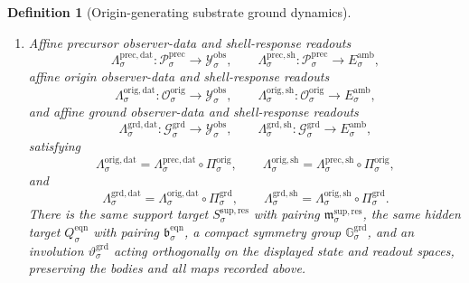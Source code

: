 \documentclass[11pt]{article}
\newcommand{\DataSpace}[1]{\mathcal Y_{#1}^{\mathrm{obs}}}
\newcommand{\AmbientTarget}[1]{E_{#1}^{\mathrm{amb}}}
\newcommand{\ResTarget}[1]{S_{#1}^{\mathrm{sup,res}}}
\newcommand{\ResPair}[1]{\mathfrak m_{#1}^{\mathrm{sup,res}}}
\newcommand{\PrecSpace}[1]{\mathcal P_{#1}^{\mathrm{prec}}}
\newcommand{\PrecData}[1]{\Lambda_{#1}^{\mathrm{prec,dat}}}
\newcommand{\PrecShellMap}[1]{\Lambda_{#1}^{\mathrm{prec,sh}}}
\newcommand{\OrigSpace}[1]{\mathcal O_{#1}^{\mathrm{orig}}}
\newcommand{\OrigProj}[1]{\Pi_{#1}^{\mathrm{orig}}}
\newcommand{\OrigData}[1]{\Lambda_{#1}^{\mathrm{orig,dat}}}
\newcommand{\OrigShellMap}[1]{\Lambda_{#1}^{\mathrm{orig,sh}}}
\newcommand{\GroundSpace}[1]{\mathcal G_{#1}^{\mathrm{grd}}}
\newcommand{\GroundProj}[1]{\Pi_{#1}^{\mathrm{grd}}}
\newcommand{\GroundData}[1]{\Lambda_{#1}^{\mathrm{grd,dat}}}
\newcommand{\GroundShellMap}[1]{\Lambda_{#1}^{\mathrm{grd,sh}}}
\newcommand{\GroundSym}[1]{\mathbb G_{#1}^{\mathrm{grd}}}
\newcommand{\GroundTime}[1]{\vartheta_{#1}^{\mathrm{grd}}}
\newcommand{\EqnTarget}[1]{Q_{#1}^{\mathrm{eqn}}}
\newcommand{\EqnPair}[1]{\mathfrak b_{#1}^{\mathrm{eqn}}}
\newtheorem{definition}{Definition}
\begin{document}
\begin{definition}[Origin-generating substrate ground dynamics]
\begin{enumerate}
    \item Affine precursor observer-data and shell-response readouts
    \[
    \PrecData{\sigma}:\PrecSpace{\sigma}\to\DataSpace{\sigma},
    \qquad
    \PrecShellMap{\sigma}:\PrecSpace{\sigma}\to\AmbientTarget{\sigma},
    \]
    affine origin observer-data and shell-response readouts
    \[
    \OrigData{\sigma}:\OrigSpace{\sigma}\to\DataSpace{\sigma},
    \qquad
    \OrigShellMap{\sigma}:\OrigSpace{\sigma}\to\AmbientTarget{\sigma},
    \]
    and affine ground observer-data and shell-response readouts
    \[
    \GroundData{\sigma}:\GroundSpace{\sigma}\to\DataSpace{\sigma},
    \qquad
    \GroundShellMap{\sigma}:\GroundSpace{\sigma}\to\AmbientTarget{\sigma},
    \]
    satisfying
    \begin{equation}
    \OrigData{\sigma}
    =
    \PrecData{\sigma}\circ\OrigProj{\sigma},
    \qquad
    \OrigShellMap{\sigma}
    =
    \PrecShellMap{\sigma}\circ\OrigProj{\sigma},
    \label{eq:groundoriginfactor}
    \end{equation}
    and
    \begin{equation}
    \GroundData{\sigma}
    =
    \OrigData{\sigma}\circ\GroundProj{\sigma},
    \qquad
    \GroundShellMap{\sigma}
    =
    \OrigShellMap{\sigma}\circ\GroundProj{\sigma}.
    \label{eq:groundfactor}
    \end{equation}
    There is the same support target \(\ResTarget{\sigma}\) with pairing \(\ResPair{\sigma}\), the same hidden target \(\EqnTarget{\sigma}\) with pairing \(\EqnPair{\sigma}\), a compact symmetry group \(\GroundSym{\sigma}\), and an involution \(\GroundTime{\sigma}\) acting orthogonally on the displayed state and readout spaces, preserving the bodies and all maps recorded above.


\end{enumerate}
\end{definition}
\end{document}
